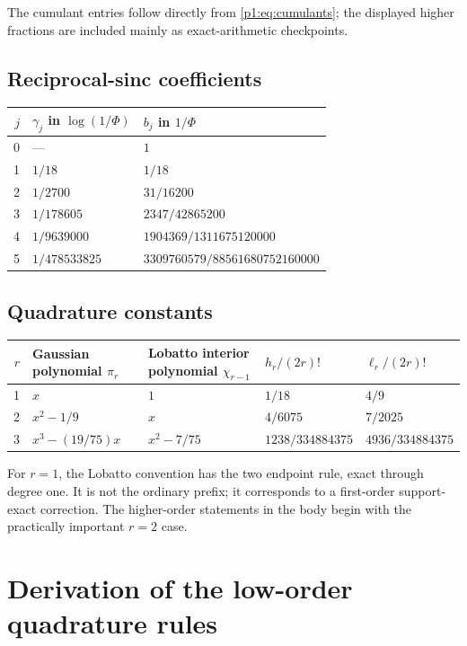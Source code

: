 \documentclass[11pt]{article}
\numberwithin{equation}{section}
\theoremstyle{definition}
\theoremstyle{remark}
\begin{document}
The cumulant entries follow directly from \eqref{p1:eq:cumulants}; the displayed higher fractions are included mainly as exact-arithmetic checkpoints.

\subsection{Reciprocal-sinc coefficients}

\begin{center}
\begin{tabular}{@{}rll@{}}
\toprule
$j$ & $\gamma_j$ in $\log(1/\Phi)$ & $b_j$ in $1/\Phi$\\
\midrule
0 & --- & $1$\\
1 & $1/18$ & $1/18$\\
2 & $1/2700$ & $31/16200$\\
3 & $1/178605$ & $2347/42865200$\\
4 & $1/9639000$ & $1904369/1311675120000$\\
5 & $1/478533825$ & $3309760579/88561680752160000$\\
\bottomrule
\end{tabular}
\end{center}

\subsection{Quadrature constants}

\begin{center}
\begin{tabularx}{0.98\textwidth}{@{}rXXll@{}}
\toprule
$r$ & Gaussian polynomial $\pi_r$ & Lobatto interior polynomial $\chi_{r-1}$ & $h_r/(2r)!$ & $\ell_r/(2r)!$\\
\midrule
1 & $x$ & $1$ & $1/18$ & $4/9$\\
2 & $x^2-1/9$ & $x$ & $4/6075$ & $7/2025$\\
3 & $x^3-(19/75)x$ & $x^2-7/75$ & $1238/334884375$ & $4936/334884375$\\
\bottomrule
\end{tabularx}
\end{center}

For $r=1$, the Lobatto convention has the two endpoint rule, exact through degree one.  It is not the ordinary prefix; it corresponds to a first-order support-exact correction.  The higher-order statements in the body begin with the practically important $r=2$ case.

\section{Derivation of the low-order quadrature rules}
\label{p1:app:low-rules}
\end{document}
